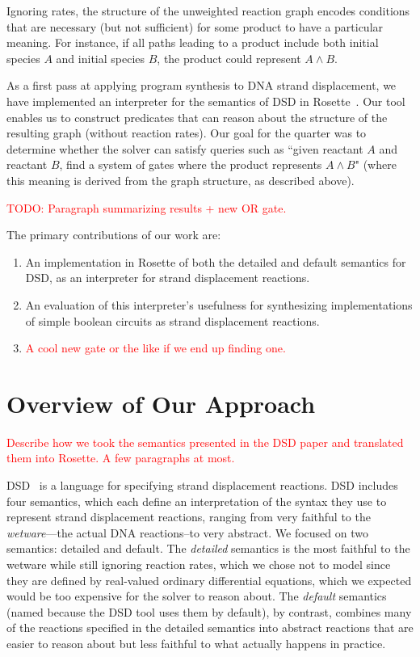 \documentclass{article}
\begin{document}
Ignoring rates, the structure of the unweighted reaction graph encodes
conditions that are necessary (but not sufficient) for some product to have a
particular meaning. For instance, if all paths leading to a product include both
initial species $A$ and initial species $B$, the product could
represent $A \land B$.

As a first pass at applying program synthesis to DNA strand
displacement, we have implemented an interpreter for the semantics of
DSD in Rosette~\cite{rosette}. Our tool enables us to construct
predicates that can reason about
the structure of the resulting graph (without reaction rates). Our goal
for the quarter was to determine whether
the solver can satisfy queries such as ``given
reactant $A$ and reactant $B$, find a system of gates where the
product represents $A \land B$" (where this meaning is derived from
the graph structure, as described above).

\textcolor{red}{TODO: Paragraph summarizing results + new OR gate.}

The primary contributions of our work are:
\begin{enumerate}
\item
  An implementation in Rosette of both the detailed
  and default semantics for DSD, as an interpreter for
  strand displacement reactions.

\item
  An evaluation of this interpreter's usefulness for synthesizing
  implementations of simple boolean circuits as strand displacement
  reactions.

\item
  \textcolor{red}{A cool new gate or the like if we end up finding one.}
\end{enumerate}

\section{Overview of Our Approach}

\textcolor{red}{Describe how we took the semantics presented in the DSD paper and translated them into Rosette. A few paragraphs at most.}

DSD~\cite{dsd} is a language for specifying strand displacement
reactions.  DSD includes four semantics, which each define an
interpretation of the syntax they use to represent strand displacement
reactions, ranging from very faithful to the \emph{wetware}---the actual
DNA reactions--to very abstract. We focused on two semantics:
detailed and default. The \emph{detailed} semantics is the most faithful
to the wetware while still ignoring reaction rates, which we chose not
to model since they are defined by real-valued ordinary differential
equations, which we expected would be too expensive for the solver to
reason about. The \emph{default} semantics (named because the DSD tool
uses them by default), by contrast, combines many of the reactions
specified in the detailed semantics into abstract reactions that
are easier to reason about but less faithful to what actually happens
in practice.
\end{document}
